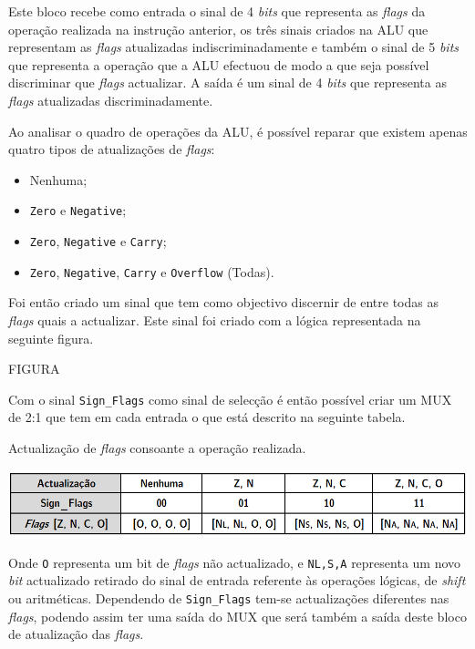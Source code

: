 \documentclass[11pt]{article}
\numberwithin{equation}{section}
\begin{document}
Este bloco recebe como entrada o sinal de 4 \textit{bits} que representa as \textit{flags} da operação realizada na instrução anterior, os três sinais criados na ALU que representam as \textit{flags} atualizadas indiscriminadamente e também o sinal de 5 \textit{bits} que representa a operação que a ALU efectuou de modo a que seja possível discriminar que \textit{flags} actualizar. A saída é um sinal de 4 \textit{bits} que representa as \textit{flags} atualizadas discriminadamente.

Ao analisar o quadro de operações da ALU, é possível reparar que existem apenas quatro tipos de atualizações de \textit{flags}:

\vspace{-2mm}

\begin{itemize}
  \item Nenhuma;
  \vspace{-2.5mm}
  \item \texttt{Zero} e \texttt{Negative};
  \vspace{-2.5mm}
  \item \texttt{Zero}, \texttt{Negative} e \texttt{Carry};
  \vspace{-2.5mm}
  \item \texttt{Zero}, \texttt{Negative}, \texttt{Carry} e \texttt{Overflow} (Todas).
\end{itemize}

Foi então criado um sinal que tem como objectivo discernir de entre todas as \textit{flags} quais a actualizar. Este sinal foi criado com a lógica representada na seguinte figura.

FIGURA

Com o sinal \texttt{Sign\_Flags} como sinal de selecção é então possível criar um MUX de 2:1 que tem em cada entrada o que está descrito na seguinte tabela.

\vspace{1.5mm}
\begin{table}[h]
	\centering
	\caption{Actualização de \textit{flags} consoante a operação realizada.}
	\vspace{-2mm}
 	\includegraphics[width=1\linewidth]{tabelas/tabelaFlags}
\end{table}

Onde \texttt{O} representa um bit de \textit{flags} não actualizado, e \texttt{N{\scriptsize {L,S,A}}} representa um novo \textit{bit} actualizado retirado do sinal de entrada referente às operações lógicas, de \textit{shift} ou aritméticas. Dependendo de \texttt{Sign\_Flags} tem-se actualizações diferentes nas \textit{flags}, podendo assim ter uma saída do MUX que será também a saída deste bloco de atualização das \textit{flags}.
\end{document}
